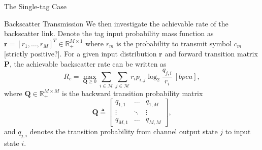 \documentclass[journal]{IEEEtran}
\begin{document}
\begin{section}{The Single-tag Case}
\begin{subsection}{Backscatter Transmission}
			We then investigate the achievable rate of the backscatter link. Denote the tag input probability mass function as $\boldsymbol{r} = [r_1,\ldots,r_M]^T \in \mathbb{R}_+^{M \times 1}$ where $r_m$ is the probability to transmit symbol $c_m$ [strictly positive?]. For a given input distribution $\boldsymbol{r}$ and forward transition matrix $\boldsymbol{P}$, the achievable backscatter rate can be written as
			\begin{equation}
				R_c = \max_{\boldsymbol{Q} \ge 0} \sum_{i \in \mathcal{M}} \sum_{j \in \mathcal{M}} r_i p_{i, j} \log_2 \frac{q_{j, i}}{r_i} \ [\si{bpcu}],
				\label{eq:secondary_rate}
			\end{equation}
			where $\boldsymbol{Q} \in \mathbb{R}_{+}^{M \times M}$ is the backward transition probability matrix
			\begin{equation}
				\boldsymbol{Q} \triangleq
				\begin{bmatrix}
					q_{1, 1} & \ldots & q_{1, M} \\
					\vdots & \ddots & \vdots \\
					q_{M, 1} & \ldots & q_{M, M}
				\end{bmatrix},
			\end{equation}
			and $q_{j, i}$ denotes the transition probability from channel output state $j$ to input state $i$.
		\end{subsection}


\end{section}
\end{document}

